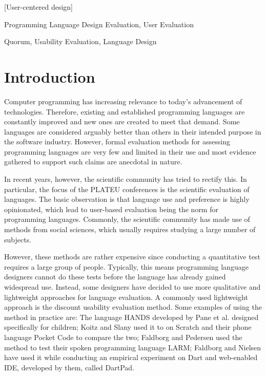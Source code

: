 \documentclass[preprint,10pt]{sigplanconf}
\begin{document}
[User-centered design]

\terms
Programming Language Design Evaluation, User Evaluation

\keywords
Quorum, Usability Evaluation, Language Design

\section{Introduction}
Computer programming has increasing relevance to today's advancement of technologies. Therefore, existing and established programming languages are constantly improved and new ones are created to meet that demand. Some languages are considered arguably better than others in their intended purpose in the software industry. However, formal evaluation methods for assessing programming languages are very few and limited in their use and most evidence gathered to support such claims are anecdotal in nature\cite{StakingClaims}. 

In recent years, however, the scientific community has tried to rectify this.
In particular, the focus of the PLATEU conferences is the scientific evaluation of languages.
The basic observation is that language use and preference is highly opinionated, which lead to user-based evaluation being the norm for programming languages.
Commonly, the scientific community has made use of methods from social sciences, which usually requires studying a large number of subjects\cite{SocioPLT}\cite{AliceCS1}\cite{BlockOrNot}\cite{FromScratch}.

However, these methods are rather expensive since conducting a quantitative test requires a large group of people. Typically, this means programming language designers cannot do these tests before the language has already gained widespread use. Instead, some designers have decided to use more qualitative and lightweight approaches for language evaluation. A commonly used lightweight approach is the discount usability evaluation method. Some examples of using the method in practice are: The language HANDS developed by Pane et al.\cite{HANDS} designed specifically for children; Koitz and Slany\cite{PocketCode} used it to on Scratch and their phone language Pocket Code to compare the two; Faldborg and Pedersen used the method to test their spoken programming language LARM; Faldborg and Nielsen have used it while conducting an empirical experiment on Dart and web-enabled IDE, developed by them, called DartPad.
\end{document}
